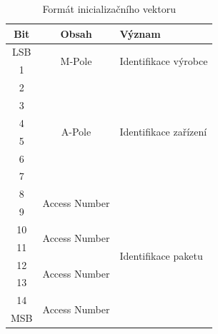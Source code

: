 \begin{table}[!ht]
  \caption{Formát inicializačního vektoru}
	\label{TabulkaInicializacniVektor}
	\vspace{-10pt}
	\begin{center}
\begin{tabular}{|c|c|l|}
\hline
\textbf{Bit} & \textbf{Obsah}                 & \textbf{Význam}                        \\ \hline \hline
LSB          & \multirow{2}{*}{M-Pole}        & \multirow{2}{*}{Identifikace výrobce}  \\ \cline{1-1}
1            &                                &                                        \\ \hline
2            & \multirow{6}{*}{A-Pole}        & \multirow{6}{*}{Identifikace zařízení} \\ \cline{1-1}
3            &                                &                                        \\ \cline{1-1}
4            &                                &                                        \\ \cline{1-1}
5            &                                &                                        \\ \cline{1-1}
6            &                                &                                        \\ \cline{1-1}
7            &                                &                                        \\ \hline
8            & \multirow{2}{*}{Access Number} & \multirow{8}{*}{Identifikace paketu}   \\ \cline{1-1}
9            &                                &                                        \\ \cline{1-2}
10           & \multirow{2}{*}{Access Number} &                                        \\ \cline{1-1}
11           &                                &                                        \\ \cline{1-2}
12           & \multirow{2}{*}{Access Number} &                                        \\ \cline{1-1}
13           &                                &                                        \\ \cline{1-2}
14           & \multirow{2}{*}{Access Number} &                                        \\ \cline{1-1}
MSB          &                                &                                        \\ \hline \hline
\end{tabular}
\vspace{-20pt}
\end{center}
\end{table}

